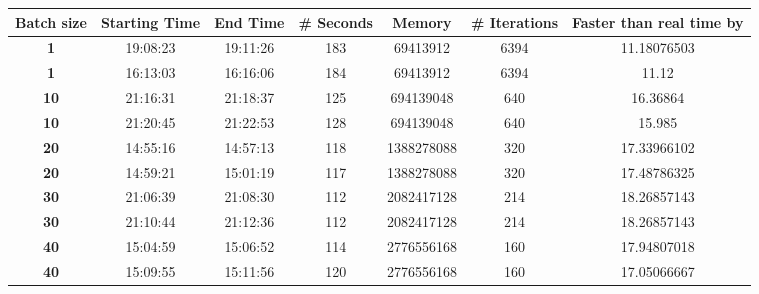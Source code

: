 \documentclass[journal]{IEEEtran}
\begin{document}
\begin{table*}[]
\centering

\begin{tabular}{|c|c|c|c|c|c|c|}
\hline

\textbf{Batch size} & \textbf{Starting Time} & \textbf{End Time} & \textbf{\# Seconds} & \textbf{Memory} & \textbf{\# Iterations} & \textbf{Faster than real time by} \\ \hline
\textbf{1}          & 19:08:23               & 19:11:26          & 183                 & 69413912        & 6394                   & 11.18076503                       \\ \hline
\textbf{1}          & 16:13:03               & 16:16:06          & 184                 & 69413912        & 6394                   & 11.12                             \\ \hline
\textbf{10}         & 21:16:31               & 21:18:37          & 125                 & 694139048       & 640                    & 16.36864                          \\ \hline
\textbf{10}         & 21:20:45               & 21:22:53          & 128                 & 694139048       & 640                    & 15.985                            \\ \hline
\textbf{20}         & 14:55:16               & 14:57:13          & 118                 & 1388278088      & 320                    & 17.33966102                       \\ \hline
\textbf{20}         & 14:59:21               & 15:01:19          & 117                 & 1388278088      & 320                    & 17.48786325                       \\ \hline
\textbf{30}         & 21:06:39               & 21:08:30          & 112                 & 2082417128      & 214                    & 18.26857143                       \\ \hline
\textbf{30}         & 21:10:44               & 21:12:36          & 112                 & 2082417128      & 214                    & 18.26857143                       \\ \hline
\textbf{40}         & 15:04:59               & 15:06:52          & 114                 & 2776556168      & 160                    & 17.94807018                       \\ \hline
\textbf{40}         & 15:09:55               & 15:11:56          & 120                 & 2776556168      & 160                    & 17.05066667                       \\ \hline

\end{tabular}
\end{table*}
\end{document}
